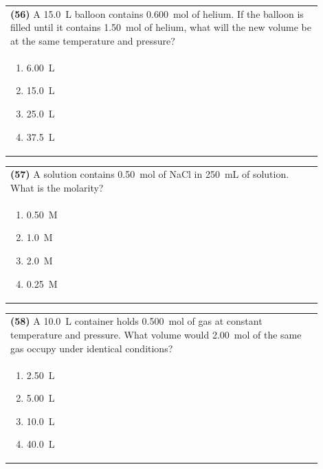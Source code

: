 \documentclass{article}
\begin{document}
{{\vspace{0.2cm}
\noindent\begin{tabular}{|p{0.9\linewidth}|}
\hline
\textbf{(56)} A 15.0~L balloon contains 0.600~mol of helium. If the balloon is filled until it contains 1.50~mol of helium, what will the new volume be at the same temperature and pressure?\\[0.2cm]
\begin{minipage}[t]{0.85\linewidth}
\begin{enumerate}[label=\alph*.]
\item 6.00~L
\item 15.0~L
\item 25.0~L
\item 37.5~L
\end{enumerate}
\end{minipage}\\[0.2cm]
\hline
\end{tabular}
\newpage

\vspace{0.2cm}
\noindent\begin{tabular}{|p{0.9\linewidth}|}
\hline
\textbf{(57)} A solution contains 0.50~mol of NaCl in 250~mL of solution. What is the molarity?\\[0.2cm]
\begin{minipage}[t]{0.85\linewidth}
\begin{enumerate}[label=\alph*.]
\item 0.50~M
\item 1.0~M
\item 2.0~M
\item 0.25~M
\end{enumerate}
\end{minipage}\\[0.2cm]
\hline
\end{tabular}

\vspace{0.2cm}
\noindent\begin{tabular}{|p{0.9\linewidth}|}
\hline
\textbf{(58)} A 10.0~L container holds 0.500~mol of gas at constant temperature and pressure. What volume would 2.00~mol of the same gas occupy under identical conditions?\\[0.2cm]
\begin{minipage}[t]{0.85\linewidth}
\begin{enumerate}[label=\alph*.]
\item 2.50~L
\item 5.00~L
\item 10.0~L
\item 40.0~L
\end{enumerate}
\end{minipage}\\[0.2cm]
\hline
\end{tabular}

}}
\end{document}
